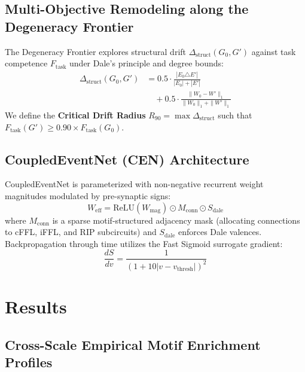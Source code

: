\documentclass[10pt,twocolumn,letterpaper]{article}
\begin{document}
\subsection{Multi-Objective Remodeling along the Degeneracy Frontier}
The Degeneracy Frontier explores structural drift $\Delta_{\mathrm{struct}}(G_0, G')$ against task competence $F_{\mathrm{task}}$ under Dale's principle and degree bounds:
\begin{equation}
\begin{split}
\Delta_{\mathrm{struct}}(G_0, G') &= 0.5 \cdot \frac{|E_0 \triangle E'|}{|E_0| + |E'|} \\
&\quad + 0.5 \cdot \frac{\|W_0 - W'\|_1}{\|W_0\|_1 + \|W'\|_1}
\end{split}
\end{equation}
We define the \textbf{Critical Drift Radius} $R_{90} = \max \Delta_{\mathrm{struct}}$ such that $F_{\mathrm{task}}(G') \ge 0.90 \times F_{\mathrm{task}}(G_0)$.

\subsection{CoupledEventNet (CEN) Architecture}
CoupledEventNet is parameterized with non-negative recurrent weight magnitudes modulated by pre-synaptic signs:
\begin{equation}
W_{\mathrm{eff}} = \mathrm{ReLU}(W_{\mathrm{mag}}) \odot M_{\mathrm{conn}} \odot S_{\mathrm{dale}}
\end{equation}
where $M_{\mathrm{conn}}$ is a sparse motif-structured adjacency mask (allocating connections to cFFL, iFFL, and RIP subcircuits) and $S_{\mathrm{dale}}$ enforces Dale valences. Backpropagation through time utilizes the Fast Sigmoid surrogate gradient:
\begin{equation}
\frac{dS}{dv} = \frac{1}{(1 + 10|v - v_{\mathrm{thresh}}|)^2}
\end{equation}

\section{Results}

\subsection{Cross-Scale Empirical Motif Enrichment Profiles}
\end{document}
